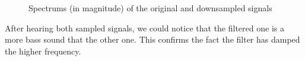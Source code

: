 \begin{figure}[!h]
	\caption{Spectrums (in magnitude) of the original and downsampled signals}%
	\label{fig:downsamplingSinusSpectrum}%
\end{figure}

After hearing both sampled signals, we could notice that the filtered one is a more bass sound that the other one. This confirms the fact the filter has damped the higher frequency.





